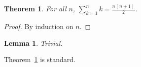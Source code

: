 \documentclass{article}
\newtheorem{theorem}{Theorem}
\newtheorem{lemma}{Lemma}
\begin{document}
\begin{theorem}\label{thm:main}
For all $n$, $\sum_{k=1}^n k = \frac{n(n+1)}{2}$.
\end{theorem}
\begin{proof}
By induction on $n$.
\end{proof}
\begin{lemma}
Trivial.
\end{lemma}
Theorem~\ref{thm:main} is standard.
\end{document}
